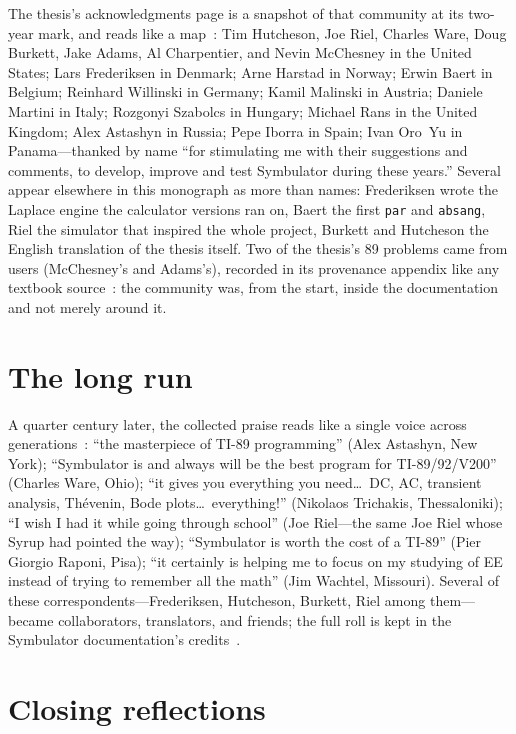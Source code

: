 \documentclass[11pt,oneside]{report}
\newcommand{\code}[1]{\texttt{#1}}
\begin{document}
The thesis's acknowledgments page is a snapshot of that community at
its two-year mark, and reads like a map~\cite[Acks.]{thesis2000}: Tim
Hutcheson, Joe Riel, Charles Ware, Doug Burkett, Jake Adams, Al
Charpentier, and Nevin McChesney in the United States; Lars
Frederiksen in Denmark; Arne Harstad in Norway; Erwin Baert in
Belgium; Reinhard Willinski in Germany; Kamil Malinski in Austria;
Daniele Martini in Italy; Rozgonyi Szabolcs in Hungary; Michael Rans
in the United Kingdom; Alex Astashyn in Russia; Pepe Iborra in Spain;
Ivan Oro~Yu in Panama---thanked by name ``for stimulating me with
their suggestions and comments, to develop, improve and test
Symbulator during these years.'' Several appear elsewhere in this
monograph as more than names: Frederiksen wrote the Laplace engine
the calculator versions ran on, Baert the first \code{par} and
\code{absang}, Riel the simulator that inspired the whole project,
Burkett and Hutcheson the English translation of the thesis itself.
Two of the thesis's 89 problems came from users (McChesney's and
Adams's), recorded in its provenance appendix like any textbook
source~\cite[App.~D]{thesis2000}: the community was, from the start,
inside the documentation and not merely around it.

\section{The long run}

A quarter century later, the collected praise reads like a single
voice across generations~\cite{symbulator-docs}: ``the masterpiece of
TI-89 programming'' (Alex Astashyn, New York); ``Symbulator is and
always will be the best program for TI-89/92/V200'' (Charles Ware,
Ohio); ``it gives you everything you need\ldots\ DC, AC, transient
analysis, Th\'evenin, Bode plots\ldots\ everything!'' (Nikolaos
Trichakis, Thessaloniki); ``I wish I had it while going through
school'' (Joe Riel---the same Joe Riel whose Syrup had pointed the
way); ``Symbulator is worth the cost of a TI-89'' (Pier Giorgio
Raponi, Pisa); ``it certainly is helping me to focus on my studying of
EE instead of trying to remember all the math'' (Jim Wachtel,
Missouri). Several of these correspondents---Frederiksen, Hutcheson,
Burkett, Riel among them---became collaborators, translators, and
friends; the full roll is kept in the Symbulator documentation's
credits~\cite{symbulator-docs}.

\section{Closing reflections}
\end{document}
